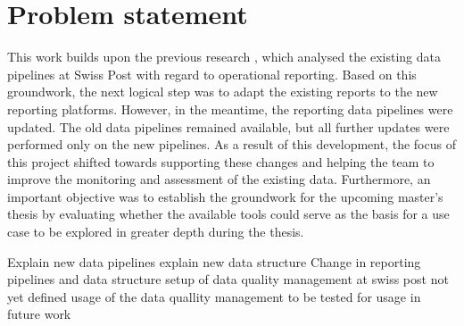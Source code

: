 
\section{Problem statement}
\label{ResearchProblemState}

This work builds upon the previous research \cite{Roccaro2026_Project1}, which analysed the existing data pipelines at Swiss Post with regard to operational reporting. Based on this groundwork, the next logical step was to adapt the existing reports to the new reporting platforms. However, in the meantime, the reporting data pipelines were updated. The old data pipelines remained available, but all further updates were performed only on the new pipelines. As a result of this development, the focus of this project shifted towards supporting these changes and helping the team to improve the monitoring and assessment of the existing data. Furthermore, an important objective was to establish the groundwork for the upcoming master's thesis by evaluating whether the available tools could serve as the basis for a use case to be explored in greater depth during the thesis.



Explain new data pipelines
explain new data structure
Change in reporting pipelines and data structure
setup of data quality management at swiss post not yet defined
usage of the data quallity management to be tested for usage in future work


